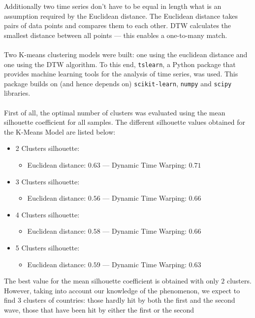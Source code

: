 \documentclass[11pt,a4paper]{article}
\begin{document}
\noindent
Additionally two time series don't have to be equal in length what is an
assumption required by the Euclidean distance. The Euclidean distance takes
pairs of data points and compares them to each other. DTW calculates the
smallest distance between all points --- this enables a one-to-many match.\\
\\
Two K-means clustering models were built: one using the euclidean distance and
one using the DTW algorithm. To this end, \texttt{tslearn}, a Python package
that provides machine learning tools for the analysis of time series, was used.
This package builds on (and hence depends on) \texttt{scikit-learn},
\texttt{numpy} and \texttt{scipy} libraries.\\
\\
First of all, the optimal number of clusters was evaluated using the mean
silhouette coefficient for all samples. The different silhouette values obtained
for the K-Means Model are listed below:
\begin{itemize}
    \item 2 Clusters silhouette:
    \begin{itemize}
        \item Euclidean distance: $0.63$ --- Dynamic Time Warping: $0.71$
    \end{itemize}
    \item 3 Clusters silhouette:
    \begin{itemize}
        \item Euclidean distance: $0.56$ --- Dynamic Time Warping: $0.66$
    \end{itemize}
    \item 4 Clusters silhouette:
    \begin{itemize}
        \item Euclidean distance: $0.58$ --- Dynamic Time Warping: $0.66$
    \end{itemize}
    \item 5 Clusters silhouette:
    \begin{itemize}
        \item Euclidean distance: $0.59$ --- Dynamic Time Warping: $0.63$
    \end{itemize}
\end{itemize}
The best value for the mean silhouette coefficient is obtained with only $2$
clusters. However, taking into account our knowledge of the phenomenon, we
expect to find $3$ clusters of countries: those hardly hit by both the first and
the second wave, those that have been hit by either the first or the second
\end{document}
